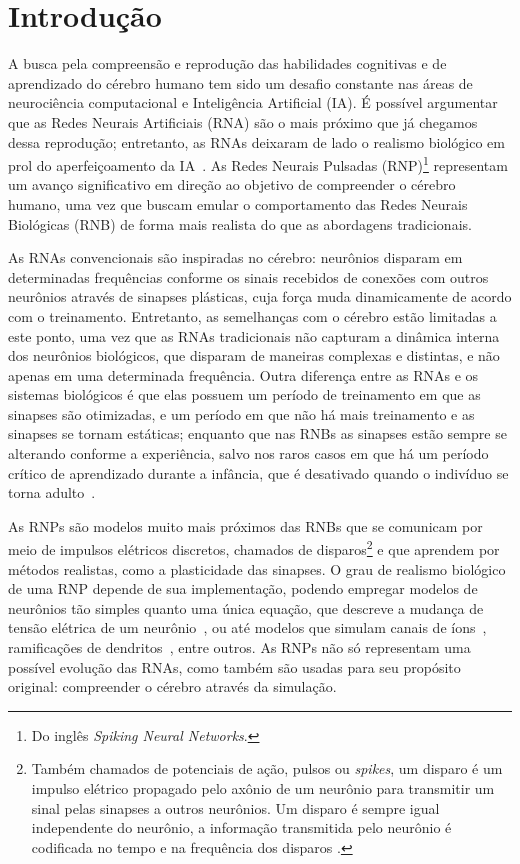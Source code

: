 \chapter{Introdução}

A busca pela compreensão e reprodução das habilidades cognitivas e de aprendizado do cérebro humano tem sido um desafio constante
nas áreas de neurociência computacional e Inteligência Artificial (IA). É possível argumentar que as Redes Neurais Artificiais
(RNA) são o mais próximo que já chegamos dessa reprodução; entretanto, as RNAs deixaram de lado o realismo biológico em prol do
aperfeiçoamento da IA~\cite{yamazakiSpiking2022}. As Redes Neurais Pulsadas (RNP)\footnote{Do inglês \textit{Spiking Neural
Networks}.} representam um avanço significativo em direção ao objetivo de compreender o cérebro humano, uma vez que buscam emular
o comportamento das Redes Neurais Biológicas (RNB) de forma mais realista do que as abordagens tradicionais.

As RNAs convencionais são inspiradas no cérebro: neurônios disparam em determinadas frequências conforme os sinais recebidos de
conexões com outros neurônios através de sinapses plásticas, cuja força muda dinamicamente de acordo com o treinamento.
Entretanto, as semelhanças com o cérebro estão limitadas a este ponto, uma vez que as RNAs tradicionais não capturam a dinâmica
interna dos neurônios biológicos, que disparam de maneiras complexas e distintas, e não apenas em uma determinada frequência.
Outra diferença entre as RNAs e os sistemas biológicos é que elas possuem um período de treinamento em que as sinapses são
otimizadas, e um período em que não há mais treinamento e as sinapses se tornam estáticas; enquanto que nas RNBs as sinapses estão
sempre se alterando conforme a experiência, salvo nos raros casos em que há um período crítico de aprendizado durante a infância,
que é desativado quando o indivíduo se torna adulto~\cite{crepelRegression1982}.

As RNPs são modelos muito mais próximos das RNBs que se comunicam por meio de impulsos elétricos discretos, chamados de
disparos\footnote{Também chamados de potenciais de ação, pulsos ou \textit{spikes}, um disparo é um impulso elétrico propagado
pelo axônio de um neurônio para transmitir um sinal pelas sinapses a outros neurônios. Um disparo é sempre igual independente do
neurônio, a informação transmitida pelo neurônio é codificada no tempo e na frequência dos disparos \cite{kandelPrinciples2021}.}
e que aprendem por métodos realistas, como a
plasticidade das sinapses. O grau de realismo biológico de uma RNP depende de sua implementação, podendo empregar modelos de
neurônios tão simples quanto uma única equação, que descreve a mudança de tensão elétrica de um neurônio~\cite{burkittReview2006},
ou até modelos que simulam canais de íons~\cite{hodgkinQuantitative1952}, ramificações de
dendritos~\cite{pagkalosIntroducing2023}, entre outros. As RNPs não só representam uma possível evolução das RNAs, como também são
usadas para seu propósito original: compreender o cérebro através da simulação.

